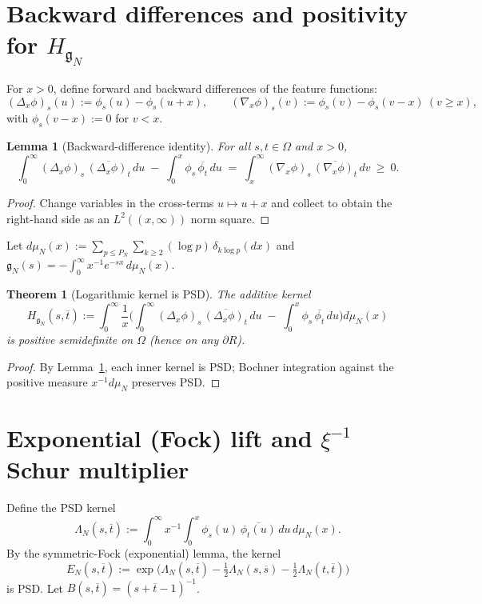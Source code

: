 \documentclass[11pt]{article}
\newtheorem{theorem}{Theorem}
\newtheorem{lemma}{Lemma}
\theoremstyle{remark}
\begin{document}
\section{Backward differences and positivity for \(H_{\mathfrak g_N}\)}
For \(x>0\), define forward and backward differences of the feature functions:
\[(\Delta_x\phi)_s(u):=\phi_s(u)-\phi_s(u+x),\qquad (\nabla_x\phi)_s(v):=\phi_s(v)-\phi_s(v-x)\ (v\ge x),\]
with \(\phi_s(v-x):=0\) for \(v<x\).

\begin{lemma}[Backward-difference identity]\label{lem:bd}
For all \(s,t\in\Omega\) and \(x>0\),
\[\int_0^\infty (\Delta_x\phi)_s\,\overline{(\Delta_x\phi)_t}\,du\; -\; \int_0^x \phi_s\,\overline{\phi_t}\,du\;=\;\int_x^\infty (\nabla_x\phi)_s\,\overline{(\nabla_x\phi)_t}\,dv\ \ge\ 0.\]
\end{lemma}
\begin{proof}
Change variables in the cross-terms \(u\mapsto u+x\) and collect to obtain the right-hand side as an \(L^2((x,\infty))\) norm square.
\end{proof}

Let \(d\mu_N(x):=\sum_{p\le P_N}\sum_{k\ge 2}(\log p)\,\delta_{k\log p}(dx)\) and \(\mathfrak g_N(s)=-\int_0^\infty x^{-1}e^{-sx}\,d\mu_N(x)\).

\begin{theorem}[Logarithmic kernel is PSD]\label{thm:Hg}
The additive kernel
\[H_{\mathfrak g_N}(s,\overline t):=\int_0^\infty \frac{1}{x}\bigg(\int_0^\infty (\Delta_x\phi)_s\,\overline{(\Delta_x\phi)_t}\,du\; -\; \int_0^x \phi_s\,\overline{\phi_t}\,du\bigg)d\mu_N(x)\]
is positive semidefinite on \(\Omega\) (hence on any \(\partial R\)).
\end{theorem}
\begin{proof}
By Lemma~\ref{lem:bd}, each inner kernel is PSD; Bochner integration against the positive measure \(x^{-1}d\mu_N\) preserves PSD.
\end{proof}

\section{Exponential (Fock) lift and \(\xi^{-1}\) Schur multiplier}
Define the PSD kernel
\[\Lambda_N(s,\overline t):=\int_0^\infty x^{-1}\int_0^x \phi_s(u)\,\overline{\phi_t(u)}\,du\,d\mu_N(x).\]
By the symmetric-Fock (exponential) lemma, the kernel
\[E_N(s,\overline t):=\exp\big(\Lambda_N(s,\overline t)-\tfrac12\Lambda_N(s,\overline s)-\tfrac12\Lambda_N(t,\overline t)\big)\]
is PSD. Let \(B(s,\overline t)=(s+\overline t-1)^{-1}\).
\end{document}
